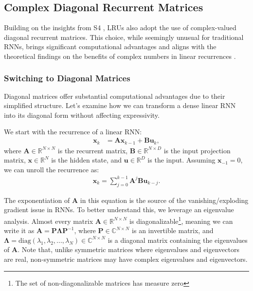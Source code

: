 \documentclass[12pt,a4paper]{report}
\begin{document}
\subsection{Complex Diagonal Recurrent Matrices}
Building on the insights from S4 \cite{s4}, LRUs also adopt the use of complex-valued diagonal recurrent matrices. This choice, while seemingly unusual for traditional RNNs, brings significant computational advantages and aligns with the theoretical findings on the benefits of complex numbers in linear recurrences \cite{universality_lrnn}.


\subsubsection{Switching to Diagonal Matrices}

Diagonal matrices offer substantial computational advantages due to their simplified structure. Let's examine how we can transform a dense linear RNN into its diagonal form without affecting expressivity.

\medskip

We start with the recurrence of a linear RNN:
\[
\begin{aligned}
\mathbf{x}_k &= \mathbf{A}\mathbf{x}_{k-1} + \mathbf{B}\mathbf{u}_k,
\end{aligned}
\]
where $\mathbf{A} \in \mathbb{R}^{N \times N}$ is the recurrent matrix, $\mathbf{B} \in \mathbb{R}^{N \times D}$ is the input projection matrix, $\mathbf{x} \in \mathbb{R}^N$ is the hidden state, and $\mathbf{u} \in \mathbb{R}^{D}$ is the input. Assuming $\mathbf{x}_{-1} = 0$, we can unroll the recurrence as:
\[
\begin{aligned}
\mathbf{x}_k = \sum^{k-1}_{j=0}\mathbf{A}^j \mathbf{B} \mathbf{u}_{k-j}.
\end{aligned}
\]

The exponentiation of $\mathbf{A}$ in this equation is the source of the vanishing/exploding gradient issue in RNNs. To better understand this, we leverage an eigenvalue analysis. Almost every matrix $\mathbf{A} \in \mathbb{R}^{N \times N}$ is diagonalizable\footnote{The set of non-diagonalizable matrices has measure zero}, meaning we can write it as $\mathbf{A} = \mathbf{P}\mathbf{\Lambda}\mathbf{P}^{-1}$, where $\mathbf{P} \in \mathbb{C}^{N \times N}$ is an invertible matrix, and $\mathbf{\Lambda} = \text{diag}(\lambda_1, \lambda_2, ..., \lambda_N) \in \mathbb{C}^{N \times N}$ is a diagonal matrix containing the eigenvalues of $\mathbf{A}$. Note that, unlike symmetric matrices where eigenvalues and eigenvectors are real, non-symmetric matrices may have complex eigenvalues and eigenvectors.
\end{document}
